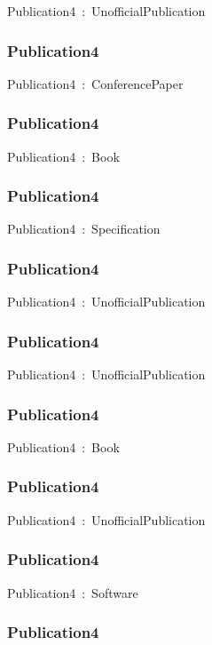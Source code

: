 \documentclass{article}
\begin{document}
Publication4~:~UnofficialPublication

\subsubsection*{Publication4}

Publication4~:~ConferencePaper

\subsubsection*{Publication4}

Publication4~:~Book

\subsubsection*{Publication4}

Publication4~:~Specification

\subsubsection*{Publication4}

Publication4~:~UnofficialPublication

\subsubsection*{Publication4}

Publication4~:~UnofficialPublication

\subsubsection*{Publication4}

Publication4~:~Book

\subsubsection*{Publication4}

Publication4~:~UnofficialPublication

\subsubsection*{Publication4}

Publication4~:~Software

\subsubsection*{Publication4}
\end{document}
